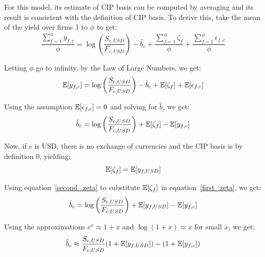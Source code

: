 



For this model, its estimate of CIP basis can be computed by averaging and its result is consistent with the definition of CIP basis.  To derive this, take the mean of the yield over firms 1 to $\phi$ to get:
\begin{equation}
\frac{\sum_{f=1}^{\phi} y_{f,c}}{\phi} =  \log\left(\frac{S_{c,USD}}{F_{c,USD}}\right) - \hat{b}_{c} 
+ \frac{\sum_{f=1}^{\phi} \zeta_{f}}{\phi} 
+ \frac{\sum_{f=1}^{\phi} \epsilon_{f,c}}{\phi}
\end{equation}

\noindent Letting $\phi$ go to infinity, by the Law of Large Numbers, we get:
\begin{equation}
 \operatorname{\mathbb{E}}[ y_{f,c} ] =  \log\left(\frac{S_{c,USD}}{F_{c,USD}}\right) - \hat{b}_{c} 
+ \operatorname{\mathbb{E}}[ \zeta_{f} ]
+ \operatorname{\mathbb{E}}[ \epsilon_{f,c} ]
\end{equation}

\noindent Using the assumption $\operatorname{\mathbb{E}}[ \epsilon_{f,c} ]=0$ and solving for $\hat{b}_{c}$ we get:
\begin{equation}
  \label{first_zeta}
\hat{b}_{c} = \log\left(\frac{S_{c,USD}}{F_{c,USD}}\right) + \operatorname{\mathbb{E}}[ \zeta_{f} ] - \operatorname{\mathbb{E}}[ y_{f,c} ]
\end{equation}


Now, if $c$ is USD, there is no exchange of currencies and the CIP basis is by definition 0, yielding:
\begin{equation}
  \label{second_zeta}
\operatorname{\mathbb{E}}[ \zeta_{f} ] =  \operatorname{\mathbb{E}}[ y_{f,USD} ]
\end{equation}

\noindent Using equation~\eqref{second_zeta} to substitute $\operatorname{\mathbb{E}}[ \zeta_{f} ]$ in equation~\eqref{first_zeta}, we get:
\begin{equation}
 \hat{b}_{c} = \log\left(\frac{S_{c,USD}}{F_{c,USD}}\right) + \operatorname{\mathbb{E}}[ y_{f,USD} ] - \operatorname{\mathbb{E}}[ y_{f,c} ] 
\end{equation}

\noindent Using the approximations $e^x \approx 1+x$ and $\log(1+x) \approx x$ for small $x$, we get:
\begin{equation}
 \hat{b}_{c} \approx \frac{S_{c,USD}}{F_{c,USD}}(1 + \operatorname{\mathbb{E}}[ y_{f,USD} ]) - (1 + \operatorname{\mathbb{E}}[ y_{f,c} ]) 
\end{equation}

